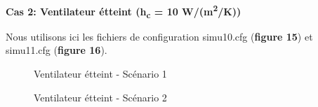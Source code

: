\documentclass[11pt]{article} %
\begin{document}
		\begin{center}
			\bf{Cas 2: Ventilateur étteint (h\textsubscript c = 10 W/(m\textsuperscript2/K))}
		\end{center}
\par Nous utilisons ici les fichiers de configuration simu\textunderscore10.cfg (\textbf{figure 15}) et simu\textunderscore11.cfg (\textbf{figure 16}).\\ 
			\begin{figure}[!htb]
				\centering
				\qquad
				\caption{Ventilateur étteint - Scénario 1}%

				\centering
				\qquad
				\caption{Ventilateur étteint - Scénario 2}%
				\label{fig:conv_stat}%
			\end{figure}
\end{document}

